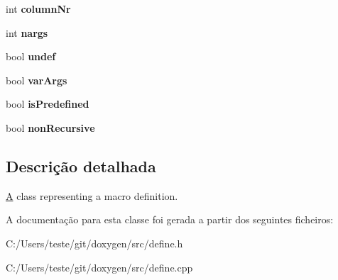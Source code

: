 \begin{DoxyCompactItemize}
\item 
\hypertarget{class_define_a6e0c1d6c3e53f3c9432cd83689f7bd38}{int {\bfseries column\-Nr}}\label{class_define_a6e0c1d6c3e53f3c9432cd83689f7bd38}

\item 
\hypertarget{class_define_a070f871efc2b5964c94459464dce54bb}{int {\bfseries nargs}}\label{class_define_a070f871efc2b5964c94459464dce54bb}

\item 
\hypertarget{class_define_a7d3874f78ae0d205bb24c02a0e7f3a0f}{bool {\bfseries undef}}\label{class_define_a7d3874f78ae0d205bb24c02a0e7f3a0f}

\item 
\hypertarget{class_define_ad9af1e0a17619341b9ded7aad7797207}{bool {\bfseries var\-Args}}\label{class_define_ad9af1e0a17619341b9ded7aad7797207}

\item 
\hypertarget{class_define_ac076c75a61bd09492fd288a39eb218af}{bool {\bfseries is\-Predefined}}\label{class_define_ac076c75a61bd09492fd288a39eb218af}

\item 
\hypertarget{class_define_ad3fa6e8bdef5d6b3907754ca2cc1c394}{bool {\bfseries non\-Recursive}}\label{class_define_ad3fa6e8bdef5d6b3907754ca2cc1c394}

\end{DoxyCompactItemize}


\subsection{Descrição detalhada}
\hyperlink{class_a}{A} class representing a macro definition. 

A documentação para esta classe foi gerada a partir dos seguintes ficheiros\-:\begin{DoxyCompactItemize}
\item 
C\-:/\-Users/teste/git/doxygen/src/define.\-h\item 
C\-:/\-Users/teste/git/doxygen/src/define.\-cpp\end{DoxyCompactItemize}
